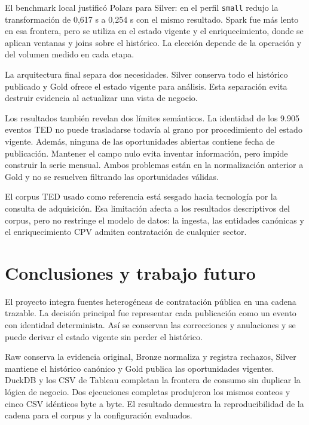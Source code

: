 \documentclass[11pt,a4paper]{article}
\begin{document}
El benchmark local justificó Polars para Silver: en el perfil
\texttt{small} redujo la transformación de 0,617 s a 0,254 s con el mismo
resultado. Spark fue más lento en esa frontera, pero se utiliza en el estado
vigente y el enriquecimiento, donde se aplican ventanas y joins sobre el
histórico. La elección depende de la operación y del volumen medido en cada
etapa.

La arquitectura final separa dos necesidades. Silver conserva todo el
histórico publicado y Gold ofrece el estado vigente para análisis. Esta
separación evita destruir evidencia al actualizar una vista de negocio.

Los resultados también revelan dos límites semánticos. La identidad de los
9.905 eventos TED no puede trasladarse todavía al grano por procedimiento del
estado vigente. Además, ninguna de las oportunidades abiertas contiene fecha
de publicación. Mantener el campo nulo evita inventar información, pero impide
construir la serie mensual. Ambos problemas están en la normalización anterior
a Gold y no se resuelven filtrando las oportunidades válidas.

El corpus TED usado como referencia está sesgado hacia tecnología por la
consulta de adquisición. Esa limitación afecta a los resultados descriptivos
del corpus, pero no restringe el modelo de datos: la ingesta, las entidades
canónicas y el enriquecimiento CPV admiten contratación de cualquier sector.

\clearpage
\section{Conclusiones y trabajo futuro}

El proyecto integra fuentes heterogéneas de contratación pública en una cadena
trazable. La decisión principal fue representar cada publicación como un
evento con identidad determinista. Así se conservan las correcciones y
anulaciones y se puede derivar el estado vigente sin perder el histórico.

Raw conserva la evidencia original, Bronze normaliza y registra rechazos,
Silver mantiene el histórico canónico y Gold publica las oportunidades
vigentes. DuckDB y los CSV de Tableau completan la frontera de consumo sin
duplicar la lógica de negocio. Dos ejecuciones completas produjeron los mismos
conteos y cinco CSV idénticos byte a byte. El resultado demuestra la
reproducibilidad de la cadena para el corpus y la configuración evaluados.
\end{document}
